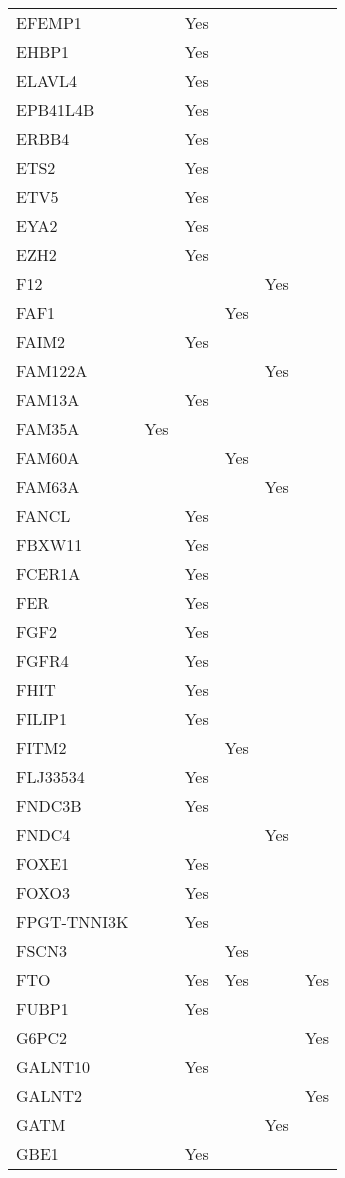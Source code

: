 \documentclass[]{report}
\begin{document}
\begin{appendices}
\begin{longtable}[t]{llllll}
EFEMP1 &  & Yes &  &  & \\
EHBP1 &  & Yes &  &  & \\
ELAVL4 &  & Yes &  &  & \\
EPB41L4B &  & Yes &  &  & \\
ERBB4 &  & Yes &  &  & \\
ETS2 &  & Yes &  &  & \\
ETV5 &  & Yes &  &  & \\
EYA2 &  & Yes &  &  & \\
EZH2 &  & Yes &  &  & \\
F12 &  &  &  & Yes & \\
FAF1 &  &  & Yes &  & \\
FAIM2 &  & Yes &  &  & \\
FAM122A &  &  &  & Yes & \\
FAM13A &  & Yes &  &  & \\
FAM35A & Yes &  &  &  & \\
FAM60A &  &  & Yes &  & \\
FAM63A &  &  &  & Yes & \\
FANCL &  & Yes &  &  & \\
FBXW11 &  & Yes &  &  & \\
FCER1A &  & Yes &  &  & \\
FER &  & Yes &  &  & \\
FGF2 &  & Yes &  &  & \\
FGFR4 &  & Yes &  &  & \\
FHIT &  & Yes &  &  & \\
FILIP1 &  & Yes &  &  & \\
FITM2 &  &  & Yes &  & \\
FLJ33534 &  & Yes &  &  & \\
FNDC3B &  & Yes &  &  & \\
FNDC4 &  &  &  & Yes & \\
FOXE1 &  & Yes &  &  & \\
FOXO3 &  & Yes &  &  & \\
FPGT-TNNI3K &  & Yes &  &  & \\
FSCN3 &  &  & Yes &  & \\
FTO &  & Yes & Yes &  & Yes\\
FUBP1 &  & Yes &  &  & \\
G6PC2 &  &  &  &  & Yes\\
GALNT10 &  & Yes &  &  & \\
GALNT2 &  &  &  &  & Yes\\
GATM &  &  &  & Yes & \\
GBE1 &  & Yes &  &  & \\

\end{longtable}
\end{appendices}
\end{document}
